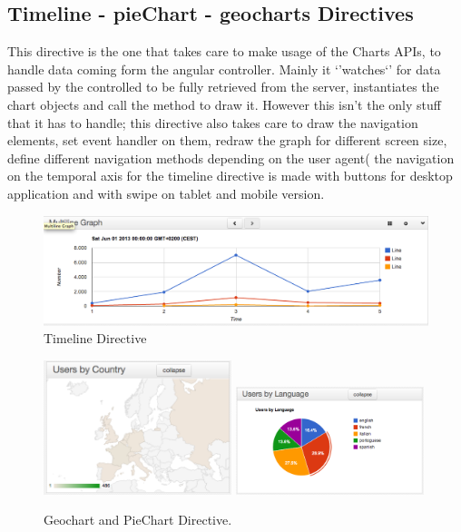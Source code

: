 \documentclass[a4paper,13pt]{report}
\begin{document}
\subsection{Timeline - pieChart - geocharts Directives} %
This directive is the one that takes care to make usage of the Charts APIs, to handle data coming form the angular controller.
Mainly it `'watches`' for data passed by the controlled to be fully retrieved from the server, instantiates the chart objects and call the method to draw it.
However this isn't the only stuff that it has to handle; this directive also takes care to draw the navigation elements, set event handler on them, redraw the graph for different screen size, define different navigation methods depending on the user agent( the navigation on the temporal axis for the timeline directive is made with buttons for desktop application and with swipe on tablet and mobile version.
\begin{figure}[H]
  \caption{Timeline Directive}
  \centering
    \includegraphics[width=1\textwidth]{pics/proto/timeline}
\end{figure}
\begin{figure}[H]
  \caption{Geochart and PieChart Directive.}
  \centering
    \includegraphics[width=0.489\textwidth]{pics/proto/geochart}
    \includegraphics[width=0.489\textwidth]{pics/proto/pieChart}
\end{figure}
\end{document}
